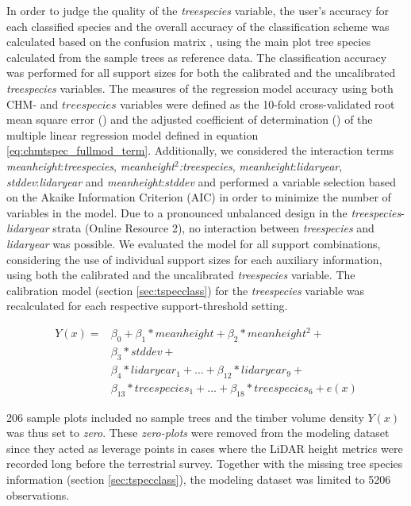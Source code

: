 In order to judge the quality of the \textit{treespecies} variable, the user's accuracy for each classified species and the overall accuracy of the classification scheme was calculated based on the confusion matrix \citep{congalton2008}, using the main plot tree species calculated from the sample trees as reference data. The classification accuracy was performed for all support sizes for both the calibrated and the uncalibrated \textit{treespecies} variables. The measures of the regression model accuracy using both CHM- and $treespecies$ variables were defined as the 10-fold cross-validated root mean square error (\rmsecv{}) and the adjusted coefficient of determination (\adjrsq{}) of the multiple linear regression model defined in equation \ref{eq:chmtspec_fullmod_term}. Additionally, we considered the interaction terms \textit{meanheight}:\textit{treespecies}, \textit{meanheight$^{2}$:treespecies}, \textit{meanheight}:\textit{lidaryear}, \textit{stddev}:\textit{lidaryear} and \textit{meanheight}:\textit{stddev} and performed a variable selection based on the Akaike Information Criterion (AIC) \citep{Akaike2011} in order to minimize the number of variables in the model. Due to a pronounced unbalanced design in the \textit{treespecies}-\textit{lidaryear} strata (Online Resource 2), no interaction between \textit{treespecies} and \textit{lidaryear} was possible. We evaluated the model for all support combinations, considering the use of individual support sizes for each auxiliary information, using both the calibrated and the uncalibrated \textit{treespecies} variable. The calibration model (section \ref{sec:tspecclass}) for the \textit{treespecies} variable was recalculated for each respective support-threshold setting.

\begin{equation} \label{eq:chmtspec_fullmod_term}
  \begin{split}
     Y(x) = &\beta_{0} + \beta_{1}*meanheight + \beta_{2}*meanheight^{2} + \\ 
            &\beta_{3}*stddev + \\
            &\beta_{4}*lidaryear_1 + ... + \beta_{12}*lidaryear_9 + \\
            &\beta_{13}*treespecies_1 + ... + \beta_{18}*treespecies_6 + e(x)
  \end{split}
\end{equation}

206 sample plots included no sample trees and the timber volume density $Y(x)$ was thus set to \textit{zero}. These \textit{zero-plots} were removed from the modeling dataset since they acted as leverage points in cases where the LiDAR height metrics were recorded long before the terrestrial survey. Together with the missing tree species information (section \ref{sec:tspecclass}), the modeling dataset was limited to 5206 observations.